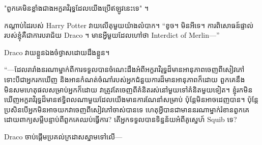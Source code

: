 "ពួកគេមិនខ្លាំងជាងអក្ខរាវិរុទ្ធដែលយើងប្រើឥឡូវនេះទេ" ។

កណ្តាប់ដៃរបស់ Harry Potter វាយលើតុមួយយ៉ាងលំបាក។ “ខូច។ មិនអីទេ។ ការពិសោធន៍ផ្ទាល់របស់ខ្ញុំគឺជាការបរាជ័យ Draco ។ មាន​អ្វី​មួយ​ដែល​ហៅ​ថា Interdict of Merlin—”

Draco វាយខ្លួនឯងចំថ្ងាសដោយដឹងខ្លួន។

“—ដែលរារាំងនរណាម្នាក់ពីការទទួលបានចំណេះដឹងអំពីអក្ខរាវិរុទ្ធដ៏មានអានុភាពចេញពីសៀវភៅ ទោះបីជាអ្នករកឃើញ និងអានកំណត់ចំណាំរបស់អ្នកជំនួយការដ៏មានអានុភាពក៏ដោយ ពួកគេនឹងមិនសមហេតុផលសម្រាប់អ្នកក៏ដោយ វាត្រូវតែចេញពីគំនិតរស់នៅមួយទៅគំនិតមួយទៀត។ ខ្ញុំ​រក​មិន​ឃើញ​អក្ខរាវិរុទ្ធ​ដ៏​មាន​ឥទ្ធិពល​ណា​មួយ​ដែល​យើង​មាន​ការ​ណែនាំ​សម្រាប់ ប៉ុន្តែ​មិន​អាច​ដេញ​បាន។ ប៉ុន្តែ​ប្រសិន​បើ​អ្នក​មិន​អាច​យក​វា​ចេញ​ពី​សៀវភៅ​ចាស់​បាន​ទេ ហេតុ​អ្វី​បាន​ជា​មាន​នរណា​ម្នាក់​រំខាន​ពួកគេ​ដោយ​ពាក្យ​សម្ដី​បន្ទាប់​ពី​ពួកគេ​ឈប់​ធ្វើការ? តើអ្នកទទួលបានទិន្នន័យអំពីគូស្នេហ៍ Squib ទេ?

Draco ចាប់​ផ្ដើម​ប្រគល់​ក្រដាស​ស្នាម​ទៅ​លើ—

